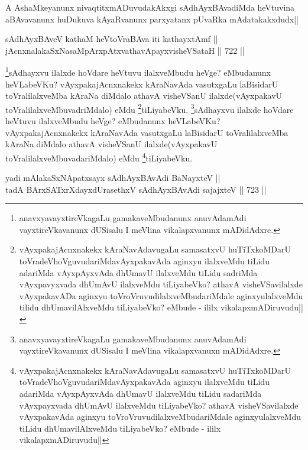 \begin{artha}
A AshaMkeyanunx nivaqtitxmADuvudakAkxgi sAdhAyxBAvadiMda heVtuvina aBAvavanunx huDukuva kAyaRvanunx parxyatanx pUvaRka mAdatakakxdudx||
\end{artha}

\begin{shl}
sAdhAyxBAveV kathaM heVtoVraBAva iti kathayxtAmf || \\
jAcnxnalakaSxNasaMpArxpAtxvathavA\s payxvisheVSataH ||  722 || 
\end{shl}

\begin{artha}
\footnote{anavxyavayxtireVkagaLu gamakaveMbudanunx anuvAdamAdi vayxtireVkavanunx dUSisalu I meVlina vikalapxvanunx mADidAdxre.}sAdhayxvu ilalxde hoVdare heVtuvu ilalxveMbudu heVge? eMbudanunx heVLabeVKu? vAyxpakajAcnxnakekx kAraNavAda vasutxgaLu laBisidarU toVralilalxveMba kAraNa diMdalo athavA visheVSanU ilalxde(vAyxpakavU toVralilalxveMbuvadriMdalo) eMdu \footnote{vAyxpakajAcnxnakekx kAraNavAdavugaLu  samasatxvU huTiTxkoMDarU toVradeVhoVguvudariMdavAyxpakavAda aginxyu ilalxveMdu tiLidu adariMda vAyxpAyxvAda dhUmavU ilalxveMdu tiLidu sadriMda vAyxpavyxvada dhUmAvU ilalxveMdu tiLiyabeVko? athavA visheVSavilalxde vAyxpakavADa aginxyu toVroVruvudilalxveMbudariMdale aginxyulalxveMdu tilidu dhUmavilAlxveMdu tiLiyabeVko? eMbude - ililx vikalapxmADiruvudu||}tiLiyabeVku.
\footnote{anavxyavayxtireVkagaLu gamakaveMbudanunx anuvAdamAdi vayxtireVkavanunx dUSisalu I meVlina vikalapxvanuxn mADidAdxre.}sAdhayxvu ilalxde hoVdare heVtuvu ilalxveMbudu heVge? eMbudanunx heVLabeVKu? vAyxpakajAcnxnakekx kAraNavAda vasutxgaLu laBisidarU toVralilalxveMba kAraNa diMdalo athavA visheVSanU ilalxde(vAyxpakavU toVralilalxveMbuvadariMdalo) eMdu \footnote{vAyxpakajAcnxnakekx kAraNavAdavugaLu  samasatxvU huTiTxkoMDarU toVradeVhoVguvudariMdavAyxpakavAda aginxyu ilalxveMdu tiLidu adariMda vAyxpAyxvAda dhUmavU ilalxveMdu tiLidu sadariMda vAyxpayxvada dhUmAvU ilalxveMdu tiLiyabeVko? athavA visheVSavilalxde vAyxpakavAda aginxyu toVroVruvudilalxveMbudariMdale aginxyulalxveMdu tiLidu dhUmavilAlxveMdu tiLiyabeVko? eMbude - ililx vikalapxmADiruvudu||}tiLiyabeVku.
\end{artha}


\begin{shl}
yadi mAlakaSxNApatxsayx sAdhAyxBAvAdi BaNayxteV || \\
tadA BArxSATxrXdayxdUrasethxV sAdhAyxBAvAdi sajajxteV ||  723 ||  
\end{shl}


